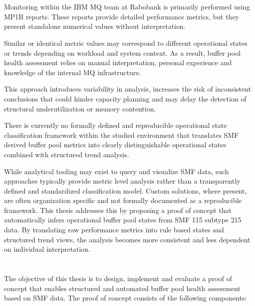 \section{}%
\label{sec:probleemstelling}

Monitoring within the IBM MQ team at Rabobank is primarily performed using MP1B reports. These reports provide detailed performance metrics, but they present standalone numerical values without interpretation.

Similar or identical metric values may correspond to different operational states or trends depending on workload and system context. As a result, buffer pool health assessment relies on manual interpretation, personal experience and knowledge of the internal MQ infrastructure.

This approach introduces variability in analysis, increases the risk of inconsistent conclusions that could hinder capacity planning and may delay the detection of structural underutilization or memory contention.

There is currently no formally defined and reproducible operational state classification framework within the studied environment that translates SMF derived buffer pool metrics into clearly distinguishable operational states combined with structured trend analysis.

While analytical tooling may exist to query and visualize SMF data, such approaches typically provide metric level analysis rather than a transparently defined and standardized classification model. Custom solutions, where present, are often organization specific and not formally documented as a reproducible framework.
This thesis addresses this by proposing a proof of concept that automatically infers operational buffer pool states from SMF 115 subtype 215 data. By translating raw performance metrics into rule based states and structured trend views, the analysis becomes more consistent and less dependent on individual interpretation.


\section{}%
\label{sec:onderzoeksdoelstelling}

The objective of this thesis is to design, implement and evaluate a proof of concept that enables structured and automated buffer pool health assessment based on SMF data.
The proof of concept consists of the following components:

